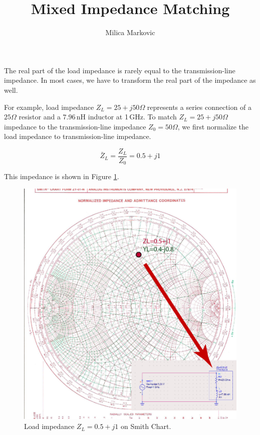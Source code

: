 \documentclass{ximera}
\title{Mixed Impedance Matching}
\author{Milica Markovic}
\begin{document}
  
\begin{abstract}  

\end{abstract}  
\maketitle    


The real part of the load impedance is rarely equal to the transmission-line impedance. In most cases, we have to transform the real part of the impedance as well. 


For example, load impedance $Z_L=25+j 50 \Omega$ represents a series connection of a $25\Omega$ resistor and a $7.96$\,nH inductor at 1\,GHz. To match $Z_L=25+j 50 \Omega$ impedance to the transmission-line impedance $Z_0=50 \Omega$, we first normalize the load impedance to transmission-line impedance.


\begin{equation}
\bar{Z}_L=\frac{Z_L}{Z_0}=0.5+j1
\end{equation}

This impedance is shown in Figure \ref{fig:PointSC}. 

\begin{figure}[htbp]
\begin{center}
\includegraphics[scale=0.5]{../jpg/MixedMatch2-01.jpg}
\end{center}
\caption{Load impedance $Z_L=0.5+j1$ on Smith Chart.}
\label{fig:PointSC}
\end{figure}
\end{document}
